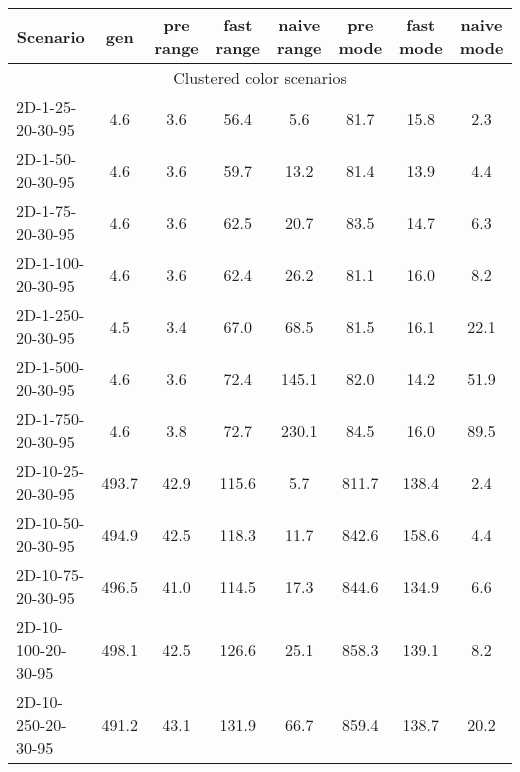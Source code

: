 \documentclass{article}
\begin{document}
\begin{table}[h]
    \begin{center}
        \begin{tabular}{|l||c|c|c|c|c|c|c|}
            \hline
            \multicolumn{1}{|c|}{Scenario} & gen     & pre range & fast range & naive range & pre mode & fast mode & naive mode \\
            \hline
            \hline
            \multicolumn{8}{|c|}{Clustered color scenarios}                                                                     \\
            \hline
            2D-1-25-20-30-95              & 4.6     & 3.6       & 56.4       & 5.6         & 81.7     & 15.8      & 2.3        \\
            2D-1-50-20-30-95              & 4.6     & 3.6       & 59.7       & 13.2        & 81.4     & 13.9      & 4.4        \\
            2D-1-75-20-30-95              & 4.6     & 3.6       & 62.5       & 20.7        & 83.5     & 14.7      & 6.3        \\
            2D-1-100-20-30-95             & 4.6     & 3.6       & 62.4       & 26.2        & 81.1     & 16.0      & 8.2        \\
            2D-1-250-20-30-95             & 4.5     & 3.4       & 67.0       & 68.5        & 81.5     & 16.1      & 22.1       \\
            2D-1-500-20-30-95             & 4.6     & 3.6       & 72.4       & 145.1       & 82.0     & 14.2      & 51.9       \\
            2D-1-750-20-30-95             & 4.6     & 3.8       & 72.7       & 230.1       & 84.5     & 16.0      & 89.5       \\
            \hline
            2D-10-25-20-30-95             & 493.7   & 42.9      & 115.6      & 5.7         & 811.7    & 138.4     & 2.4        \\
            2D-10-50-20-30-95             & 494.9   & 42.5      & 118.3      & 11.7        & 842.6    & 158.6     & 4.4        \\
            2D-10-75-20-30-95             & 496.5   & 41.0      & 114.5      & 17.3        & 844.6    & 134.9     & 6.6        \\
            2D-10-100-20-30-95            & 498.1   & 42.5      & 126.6      & 25.1        & 858.3    & 139.1     & 8.2        \\
            2D-10-250-20-30-95            & 491.2   & 43.1      & 131.9      & 66.7        & 859.4    & 138.7     & 20.2       \\

\end{tabular}
\end{center}
\end{table}
\end{document}
